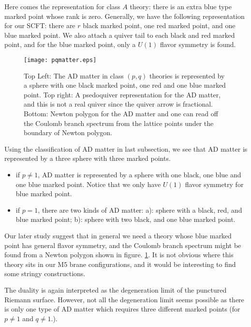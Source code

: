 \documentclass[a4paper,11pt]{article}
\begin{document}
Here comes the representation for class $A$ theory:  there is an extra blue type marked point whose rank is zero.  Generally, we have 
the following representation for our SCFT: there are $r$ black marked point, one red marked point, and one blue marked point. We also 
attach a quiver tail to each black and red marked point, and for the blue marked point, only a $U(1)$ flavor symmetry is found.

\begin{figure}[h]
\centering
  \texttt{[image: pqmatter.eps]}
  \caption{Top Left: The AD matter in class $(p,q)$ theories is represented by a sphere with one black marked point, one red and one blue marked point. Top right: A psedoquiver representation for 
  the AD matter, and this is not a real quiver since the quiver arrow is fractional. Bottom: Newton polygon for the AD matter and one can read off the Coulomb branch spectrum from the lattice points 
  under the boundary of Newton polygon. }
  \label{pqnewton}
\end{figure}


Using the classification of AD matter in last subsection, we see that AD matter is represented by a three sphere with three marked points.
\begin{itemize}
\item if $p\neq 1$, AD matter is represented by a sphere with one black, one blue and one blue marked point. 
Notice that we only have $U(1)$ flavor symmetry for blue marked point. 
\item if $p=1$, there are two kinds of AD matter: a): sphere with a black, red, and blue marked point; b): sphere
with two black, and one blue marked point. 
\end{itemize}

Our later study suggest that in general we need a theory whose blue 
marked point has general flavor symmetry, and the Coulomb branch spectrum might be found from a Newton polygon shown in figure. \ref{pqnewton}.
It is not obvious where this theory sits in our M5 brane configurations, and it would be interesting to find some stringy constructions. 

The duality is again interpreted as the degeneration limit of the punctured Riemann surface. However,  not all the degeneration limit seems possible as there is 
only one type of AD matter which  requires three different marked points (for $p\neq 1$ and $q\neq 1$.). 
\end{document}
